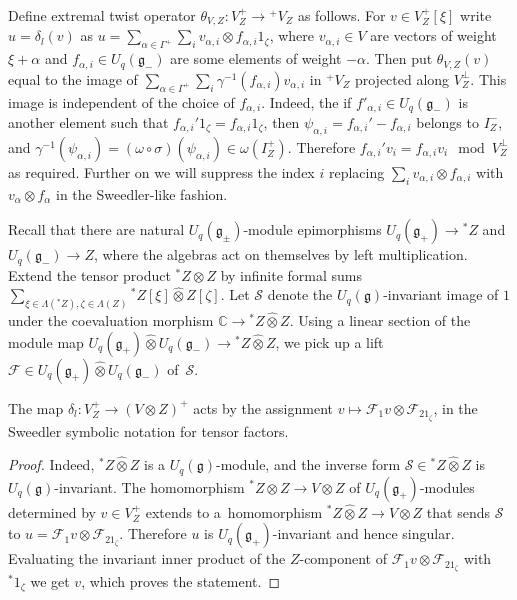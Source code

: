 Define extremal twist operator $\theta_{V,Z}\colon V^+_Z\to {}^+\!V_Z$ as follows. For $v\in V^+_Z[\xi]$ write $u=\delta_l(v)$ as $u=\sum_{\alpha\in \Gamma^+}\sum_i v_{\alpha,i}\otimes f_{\alpha,i} 1_\zeta$, where $v_{\alpha,i}\in V$ are vectors of weight $\xi+\alpha$ and $f_{\alpha,i}\in U_q(\mathfrak{g}_-)$ are some elements of weight $-\alpha$. Then put $\theta_{V,Z}(v)$ equal to the image of $\sum_{\alpha\in \Gamma^+}\sum_{i}\gamma^{-1}(f_{\alpha,i})v_{\alpha,i}$ in ${}^+\!V_Z$ projected along $V^\perp_Z$. This image is independent of the choice of $f_{\alpha,i}$. Indeed, the if $f'_{\alpha,i}\in U_q(\mathfrak{g}_-)$ is another element such that $f_{\alpha,i}'1_\zeta=f_{\alpha,i}1_\zeta$, then $\psi_{\alpha,i}=f_{\alpha,i}'-f_{\alpha,i}$ belongs to $I^-_Z$, and $\gamma^{-1}(\psi_{\alpha,i})=(\omega \circ \sigma) (\psi_{\alpha,i})\in \omega(I^+_Z)$. Therefore $f_{\alpha,i}'v_i=f_{\alpha,i}v_i \mod V^\perp_Z$ as required. Further on we will suppress the index $i$ replacing $\sum_iv_{\alpha,i}\otimes f_{\alpha,i}$ with $ v_{\alpha}\otimes f_{\alpha}$ in the Sweedler-like fashion.

Recall that there are natural $U_q(\mathfrak{g}_\pm)$-module epimorphisms $U_q(\mathfrak{g}_+)\to {}^*\!Z$ and $U_q(\mathfrak{g}_-)\to Z$, where the algebras act on themselves by left multiplication. Extend the tensor product ${}^*\!Z\otimes Z$ by infinite formal sums $\sum_{\xi\in \Lambda({}^*\!Z), \zeta\in \Lambda(Z)}{}^*\!Z[\xi]\hat \otimes Z[\zeta]$. Let $\mathcal{S}$ denote the $U_q(\mathfrak{g})$-invariant image of $1$ under the coevaluation morphism $\mathbb{C}\to {}^*\!Z\hat \otimes Z$. Using a linear section of the module map $U_q(\mathfrak{g}_+)\hat \otimes U_q(\mathfrak{g}_-)\to {}^*\!Z\hat \otimes Z$, we pick up a lift $\mathcal{F}\in U_q(\mathfrak{g}_+)\hat \otimes U_q(\mathfrak{g}_-)$ of~$\mathcal{S}$.
\begin{Lemma}The map $\delta_l\colon V^+_Z\to (V\otimes Z)^+$ acts by the assignment $v\mapsto \mathcal{F}_1v\otimes \mathcal{F}_21_\zeta$, in the Sweedler symbolic notation for tensor factors.
\end{Lemma}
\begin{proof} Indeed, ${}^*\!Z\hat \otimes Z$ is a $U_q(\mathfrak{g})$-module, and the inverse form $\mathcal{S}\in {}^*\!Z\hat \otimes Z$ is $U_q(\mathfrak{g})$-invariant. The homomorphism ${}^*\!Z \otimes Z\to V\otimes Z$ of $U_q(\mathfrak{g}_+)$-modules determined by $v\in V^+_Z$ extends to a~homomorphism ${}^*\!Z\hat \otimes Z\to V\otimes Z$ that sends $\mathcal{S}$ to $u=\mathcal{F}_1v\otimes \mathcal{F}_21_\zeta$. Therefore $u$ is $U_q(\mathfrak{g}_+)$-invariant and hence singular. Evaluating the invariant inner product of the $Z$-component of $\mathcal{F}_1v\otimes \mathcal{F}_21_\zeta$ with ${}^*\!1_\zeta$ we get $v$, which proves the statement.
\end{proof}

